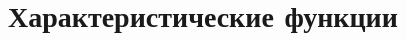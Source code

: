 \documentclass[../TV&MS.tex]{subfiles}
\begin{document}
\section{Характеристические функции}



\newpage
\end{document}
